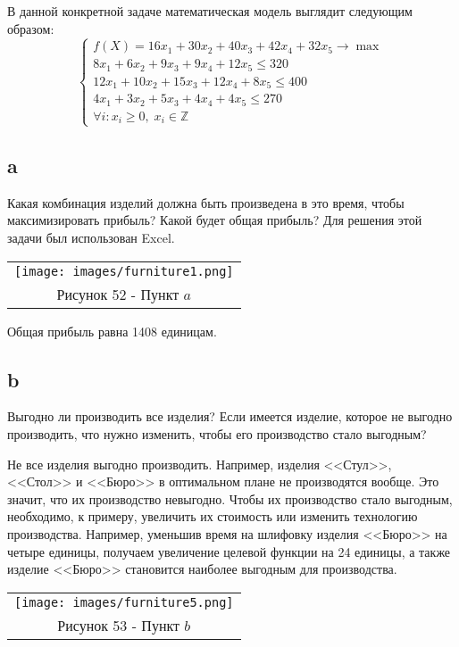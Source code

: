 \documentclass[12pt]{article}
\theoremstyle{definition}
\theoremstyle{remark}
\begin{document}
В данной конкретной задаче математическая модель выглядит следующим образом:
$$\begin{cases}
    f(X) = 16 x_1 + 30 x_2 + 40 x_3 + 42 x_4 + 32 x_5 \rightarrow \max \\
    8 x_1 + 6 x_2 + 9 x_3 + 9 x_4 + 12 x_5 \leqslant 320 \\
    12 x_1 + 10 x_2 + 15 x_3 + 12 x_4 + 8 x_5 \leqslant 400 \\
    4 x_1 + 3 x_2 + 5 x_3 + 4 x_4 + 4 x_5 \leqslant 270 \\
    \forall i: x_i \geqslant 0, \; x_i \in \mathbb{Z}
\end{cases}$$

\subsection*{a}
Какая комбинация изделий должна быть произведена в это время, чтобы максимизировать прибыль? Какой будет общая прибыль?
Для решения этой задачи был использован Excel.

\begin{center}
  \begin{tabular}{c}
\texttt{[image: images/furniture1.png]}\\
Рисунок 52 - Пункт $a$
\end{tabular}
\end{center}

Общая прибыль равна 1408 единицам.

\subsection*{b}
Выгодно ли производить все изделия? Если имеется изделие, которое не выгодно производить, что нужно изменить, чтобы его производство стало выгодным?

Не все изделия выгодно производить. Например, изделия <<Стул>>, <<Стол>> и <<Бюро>> в оптимальном плане не производятся вообще. Это значит, что их производство невыгодно. Чтобы их производство стало выгодным, необходимо, к примеру, увеличить их стоимость или изменить технологию производства. Например, уменьшив время на шлифовку изделия <<Бюро>> на четыре единицы, получаем увеличение целевой функции на 24 единицы, а также изделие <<Бюро>> становится наиболее выгодным для производства.

\begin{center}
  \begin{tabular}{c}
\texttt{[image: images/furniture5.png]}\\
Рисунок 53 - Пункт $b$
\end{tabular}
\end{center}
\end{document}
